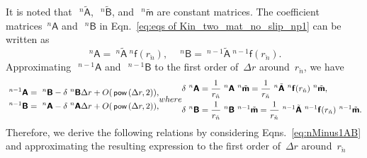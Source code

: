 \documentclass[preprint,12pt,times]{elsarticle}
\newcommand{\minus}[1]{\check{#1}}
\numberwithin{equation}{section}
\renewcommand{\u}[1]{\boldsymbol{#1}}
\newcommand{\usf}[1]{\u{\mathsf #1}}
\newcommand{\pr}[1]{\left( #1 \right)}
\newcommand{\p}{\,\textsf{\small pow}}
\newcommand{\Inv}{\,\mathrm{Inv}}
\renewcommand{\>}{$\Rightarrow$}
\begin{document}
It is noted that~$~^{n}\tilde{\usf{A}}$,~$~^{n}\tilde{\usf{B}}$, and~$~^{n}\tilde{\usf{m}}$ are constant matrices. The coefficient matrices~${}^{n}{\usf{A}}$ and~$~^{n}{\usf{B}}$ in Eqn.~\eqref{eq:eqs of Kin_two_mat_no_slip_np1} can be written as
\begin{equation}
	~^{n}{\usf{A}} = ~^{n}\tilde{\usf{A}}  ~^{n}\usf{f}(r_{\minus{n}}), \quad
	~^{n}{\usf{B}} = ~^{n-1}\tilde{\usf{A}}  ~^{n-1}\usf{f}(r_{\minus{n}}).
\end{equation}
Approximating~$~^{{n-1}}{\usf{A}}$ and~$~^{{n-1}}{\usf{B}}$ to the first order of~$\Delta r$ around~$r_{\minus{n}}$, we have
\begin{subequations}
\begin{align}
	~^{{n-1}}{\usf{A}} & = ~^{n}\usf{B} - \delta ~^{n}\usf{B} \Delta r + O(\p\pr{\Delta r,2}), \\
	~^{{n-1}}{\usf{B}} & = ~^{n}\usf{A} - \delta ~^{n}\usf{A} \Delta r + O(\p\pr{\Delta r,2}),
\end{align}
where
	\begin{align}
	\delta ~^{n}\usf{A} & = \frac{1}{r_{\minus{n}}} ~^{n}\usf{A} ~^{n}\tilde{\usf{m}} = \frac{1}{r_{\minus{n}}} ~^{n}\tilde{\usf{A}} ~^{n}\usf{f}(r_{\minus{n}}) ~^{n}\tilde{\usf{m}}, \\
	\delta ~^{n}\usf{B} & = \frac{1}{r_{\minus{n}}} ~^{n}\usf{B} ~^{n-1}\tilde{\usf{m}} = \frac{1}{r_{\minus{n}}} ~^{n-1}\tilde{\usf{A}} ~^{n-1}\usf{f}(r_{\minus{n}}) ~^{n-1}\tilde{\usf{m}}.
	\end{align}
\label{eq:nMinus1AB}
\end{subequations}
Therefore, we derive the following relations by considering Eqns.~\eqref{eq:nMinus1AB} and approximating the resulting expression to the first order of~$\Delta r$ around~$r_{\minus{n}}$
\end{document}
